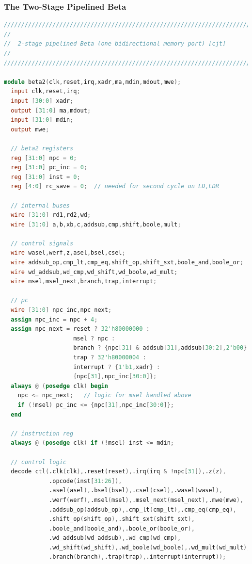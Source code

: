 \documentclass{article}
\begin{document}
\subsubsection{The Two-Stage Pipelined Beta}
\begin{lstlisting}[language=Verilog]
///////////////////////////////////////////////////////////////////////////////
//
//	2-stage pipelined Beta (one bidirectional memory port) [cjt]
//
///////////////////////////////////////////////////////////////////////////////

module beta2(clk,reset,irq,xadr,ma,mdin,mdout,mwe);
  input clk,reset,irq;
  input [30:0] xadr;
  output [31:0] ma,mdout;
  input [31:0] mdin;
  output mwe;

  // beta2 registers
  reg [31:0] npc = 0;
  reg [31:0] pc_inc = 0;
  reg [31:0] inst = 0;
  reg [4:0] rc_save = 0;  // needed for second cycle on LD,LDR

  // internal buses
  wire [31:0] rd1,rd2,wd;
  wire [31:0] a,b,xb,c,addsub,cmp,shift,boole,mult;

  // control signals
  wire wasel,werf,z,asel,bsel,csel;
  wire addsub_op,cmp_lt,cmp_eq,shift_op,shift_sxt,boole_and,boole_or;
  wire wd_addsub,wd_cmp,wd_shift,wd_boole,wd_mult;
  wire msel,msel_next,branch,trap,interrupt;

  // pc
  wire [31:0] npc_inc,npc_next;
  assign npc_inc = npc + 4;
  assign npc_next = reset ? 32'h80000000 :
                    msel ? npc :
                    branch ? {npc[31] & addsub[31],addsub[30:2],2'b00} :
                    trap ? 32'h80000004 :
                    interrupt ? {1'b1,xadr} :
                    {npc[31],npc_inc[30:0]};
  always @ (posedge clk) begin
    npc <= npc_next;   // logic for msel handled above
    if (!msel) pc_inc <= {npc[31],npc_inc[30:0]};
  end

  // instruction reg
  always @ (posedge clk) if (!msel) inst <= mdin;

  // control logic
  decode ctl(.clk(clk),.reset(reset),.irq(irq & !npc[31]),.z(z),
             .opcode(inst[31:26]),
             .asel(asel),.bsel(bsel),.csel(csel),.wasel(wasel),
             .werf(werf),.msel(msel),.msel_next(msel_next),.mwe(mwe),
             .addsub_op(addsub_op),.cmp_lt(cmp_lt),.cmp_eq(cmp_eq),
             .shift_op(shift_op),.shift_sxt(shift_sxt),
             .boole_and(boole_and),.boole_or(boole_or),
             .wd_addsub(wd_addsub),.wd_cmp(wd_cmp),
             .wd_shift(wd_shift),.wd_boole(wd_boole),.wd_mult(wd_mult),
             .branch(branch),.trap(trap),.interrupt(interrupt));
                  

\end{lstlisting}
\end{document}
